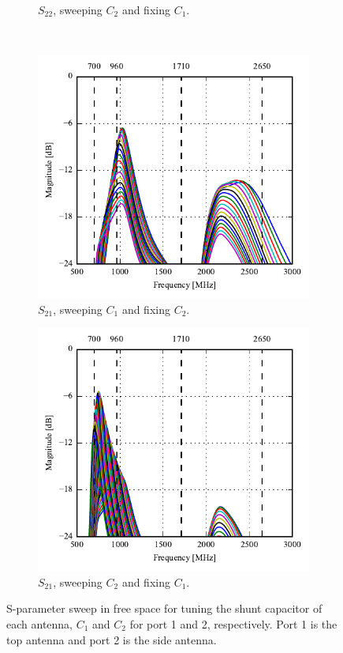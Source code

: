 \begin{figure}[htbp]
\begin{subfigure}[b]{0.49\linewidth}
        \caption{$S_{22}$, sweeping $C_2$ and fixing $C_1$.}
    \end{subfigure}
~
    \begin{subfigure}[b]{0.49\linewidth}
        \centering
        \includegraphics{img/tech_sol/monopole/5mm/sweep_s11_s21}
        \caption{$S_{21}$, sweeping $C_1$ and fixing $C_2$.}
    \end{subfigure}
    \hfill
    \begin{subfigure}[b]{0.49\linewidth}
        \centering
        \includegraphics{img/tech_sol/monopole/5mm/sweep_s22_s21_12p}
        \caption{$S_{21}$, sweeping $C_2$ and fixing $C_1$.}
    \end{subfigure}
    \caption{S-parameter sweep in free space for tuning the shunt capacitor of each antenna, $C_1$ and $C_2$ for port 1 and 2, respectively. Port 1 is the top antenna and port 2 is the side antenna.}
    \label{fig:sparam_mono_6pf_free_space}
\end{figure}

